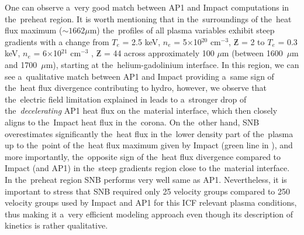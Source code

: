 One can observe a~very good
match between AP1 and Impact computations in the~preheat region.
It is worth mentioning that in the~surroundings of the~heat flux maximum 
($\sim 1662 \mu$m) the~profiles of all plasma variables exhibit steep gradients 
with a change from $T_e$ = 2.5 keV, $n_e$ = 5$\times$10$^{20}$ cm$^{−3}$, 
$\Zbar$ = 2 to $T_e$ = 0.3 keV, $n_e$ = 6$\times$10$^{21}$ cm$^{−3}$ , 
$\Zbar$ = 44 across approximately 100 $\mu$m 
(between 1600~$\mu$m and 1700~$\mu$m), starting at the~helium-gadolinium 
interface.  
In this region, we can see a~qualitative match between AP1 and Impact providing
a~same sign of the~heat flux divergence contributing to hydro, however,
we observe that the~electric field limitation explained in 
 leads to a~stronger drop of 
the~\textit{decelerating} AP1 heat flux on the~material 
interface, which then closely aligns to the~Impact heat flux in the~corona. 
On the~other hand, 
SNB overestimates significantly the~heat flux in the~lower density part 
of the~plasma up to the~point of the~heat flux maximum given by Impact 
(green line in ), and more 
importantly, the~opposite sign of the~heat flux divergence compared to Impact
(and AP1) in the~steep gradients region close to the~material interface. 
In the~preheat region SNB performs 
very well same as AP1. Nevertheless, it is important to stress that 
SNB required only 25 velocity groups compared to 250 velocity groups used by
Impact and AP1 for this ICF relevant plasma conditions, thus making it a~very
efficient modeling approach even though its description of kinetics is rather
qualitative.

%
